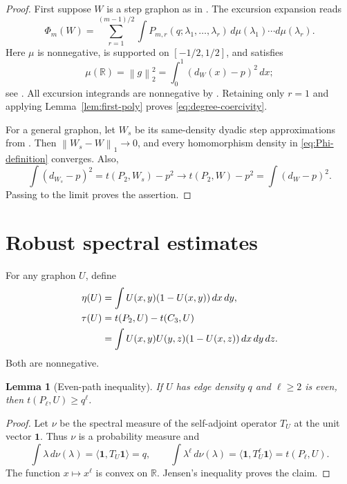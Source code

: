 \documentclass[11pt]{article}
\newtheorem{lemma}{Lemma}[section]
\theoremstyle{remark}
\newcommand{\ind}{\mathbf{1}}
\newcommand{\R}{\mathbb{R}}
\newcommand{\norm}[1]{\left\lVert #1\right\rVert}
\begin{document}
\begin{proof}
First suppose $W$ is a step graphon as in \cite[Section~2]{dense}.
The excursion expansion \cite[Eq.~(3.10)]{dense} reads
\[
 \Phi_m(W)=\sum_{r=1}^{(m-1)/2}
 \int P_{m,r}(q;\lambda_1,\ldots,\lambda_r)
       \,d\mu(\lambda_1)\cdots d\mu(\lambda_r).
\]
Here $\mu$ is nonnegative, is supported on $[-1/2,1/2]$, and satisfies
\[
 \mu(\R)=\norm{g}_2^2
 =\int_0^1(d_W(x)-p)^2\,dx;
\]
see \cite[Eq.~(2.3) and the proof of Proposition~6.1]{dense}.
All excursion integrands are nonnegative by
\cite[Section~5]{dense}. Retaining only $r=1$ and applying
Lemma~\ref{lem:first-poly} proves \eqref{eq:degree-coercivity}.

For a general graphon, let $W_s$ be its same-density dyadic step
approximations from \cite[Lemma~2.1 and Appendix~A]{dense}.
Then $\norm{W_s-W}_1\to0$, and every homomorphism density in
\eqref{eq:Phi-definition} converges. Also,
\[
 \int(d_{W_s}-p)^2=t(P_2,W_s)-p^2
 \longrightarrow t(P_2,W)-p^2=\int(d_W-p)^2.
\]
Passing to the limit proves the assertion.
\end{proof}

\section{Robust spectral estimates}

For any graphon $U$, define
\begin{align}
 \eta(U)&=\int U(x,y)(1-U(x,y))\,dx\,dy,\label{eq:eta-def}\\
 \tau(U)&=t(P_2,U)-t(C_3,U)\notag\\
 &=\int U(x,y)U(y,z)(1-U(x,z))\,dx\,dy\,dz.\label{eq:tau-def}
\end{align}
Both are nonnegative.

\begin{lemma}[Even-path inequality]\label{lem:path}
If $U$ has edge density $q$ and $\ell\geq2$ is even, then
$t(P_\ell,U)\geq q^\ell$.
\end{lemma}

\begin{proof}
Let $\nu$ be the spectral measure of the self-adjoint operator $T_U$
at the unit vector $\ind$. Thus $\nu$ is a probability measure and
\[
 \int\lambda\,d\nu(\lambda)=\langle\ind,T_U\ind\rangle=q,
 \qquad
 \int\lambda^\ell\,d\nu(\lambda)
 =\langle\ind,T_U^\ell\ind\rangle=t(P_\ell,U).
\]
The function $x\mapsto x^\ell$ is convex on $\R$.
Jensen's inequality proves the claim.
\end{proof}
\end{document}
